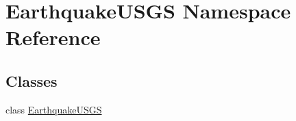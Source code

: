 \hypertarget{namespace_earthquake_u_s_g_s}{}\section{Earthquake\+U\+S\+G\+S Namespace Reference}
\label{namespace_earthquake_u_s_g_s}
\subsection*{Classes}
\begin{DoxyCompactItemize}
\item 
class \hyperlink{class_earthquake_u_s_g_s_1_1_earthquake_u_s_g_s}{Earthquake\+U\+S\+G\+S}
\end{DoxyCompactItemize}

